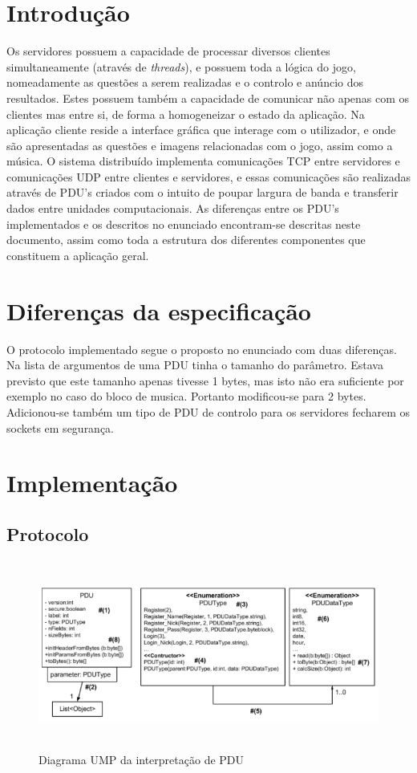\documentclass[runningheads,a4paper]{llncs}
\begin{document}
\section{Introdução}

Os servidores possuem a capacidade de processar diversos clientes simultaneamente (através de \emph{threads}), e possuem toda a lógica do jogo, nomeadamente as questões a serem realizadas e o controlo e anúncio dos resultados. Estes possuem também a capacidade de comunicar não apenas com os clientes mas entre si, de forma a homogeneizar o estado da aplicação. Na aplicação cliente reside a interface gráfica que interage com o utilizador, e onde são apresentadas as questões e imagens relacionadas com o jogo, assim como a música. O sistema distribuído implementa comunicações TCP entre servidores e comunicações UDP entre clientes e servidores, e essas comunicações são realizadas através de PDU's criados com o intuito de poupar largura de banda e transferir dados entre unidades computacionais. As diferenças entre os PDU's implementados e os descritos no enunciado encontram-se descritas neste documento, assim como toda a estrutura dos diferentes componentes que constituem a aplicação geral.

\section{Diferenças da especificação}

O protocolo implementado segue o proposto no enunciado com duas diferenças.
Na lista de argumentos de uma PDU tinha o tamanho do parâmetro. Estava previsto que este tamanho apenas tivesse 1 bytes, mas isto não era suficiente por exemplo no caso do bloco de musica. Portanto modificou-se para 2 bytes.
Adicionou-se também um tipo de PDU de controlo para os servidores fecharem os sockets em segurança. 

\section{Implementação}

\subsection{Protocolo}


\begin{figure}
\centering
\includegraphics[height=6.2cm]{UDP.png}
\caption{Diagrama UMP da interpretação de PDU}
\label{fig:diagram-pdu}
\end{figure}
\end{document}
